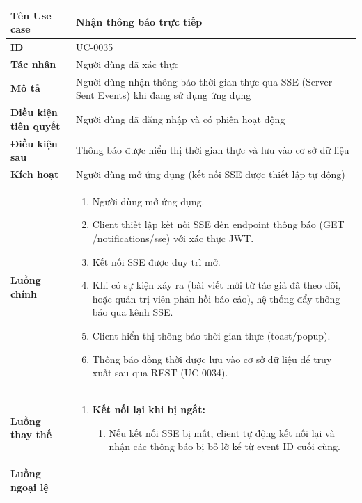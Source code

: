 {
\small
\renewcommand{\arraystretch}{1.15}

\begin{tabularx}{\textwidth}{|>{\raggedright\arraybackslash}p{3.5cm}|>{\raggedright\arraybackslash}X|}
\hline
\textbf{Tên Use case} & Nhận thông báo trực tiếp \\
\hline
\textbf{ID} & UC-0035 \\
\hline
\textbf{Tác nhân} & Người dùng đã xác thực \\
\hline
\textbf{Mô tả} & Người dùng nhận thông báo thời gian thực qua SSE (Server-Sent Events) khi đang sử dụng ứng dụng \\
\hline
\textbf{Điều kiện tiên quyết} & Người dùng đã đăng nhập và có phiên hoạt động \\
\hline
\textbf{Điều kiện sau} & Thông báo được hiển thị thời gian thực và lưu vào cơ sở dữ liệu \\
\hline
\textbf{Kích hoạt} & Người dùng mở ứng dụng (kết nối SSE được thiết lập tự động) \\
\hline
\textbf{Luồng chính} &
\begin{enumerate}
    \item Người dùng mở ứng dụng.
    \item Client thiết lập kết nối SSE đến endpoint thông báo (GET /notifications/sse) với xác thực JWT.
    \item Kết nối SSE được duy trì mở.
    \item Khi có sự kiện xảy ra (bài viết mới từ tác giả đã theo dõi, hoặc quản trị viên phản hồi báo cáo), hệ thống đẩy thông báo qua kênh SSE.
    \item Client hiển thị thông báo thời gian thực (toast/popup).
    \item Thông báo đồng thời được lưu vào cơ sở dữ liệu để truy xuất sau qua REST (UC-0034).
\end{enumerate} \\
\hline
\textbf{Luồng thay thế} &
\begin{enumerate}
    \item \textbf{Kết nối lại khi bị ngắt:}
    \begin{enumerate}
        \item[3A.] Nếu kết nối SSE bị mất, client tự động kết nối lại và nhận các thông báo bị bỏ lỡ kể từ event ID cuối cùng.
    \end{enumerate}
\end{enumerate} \\
\hline
\textbf{Luồng ngoại lệ} &

\end{tabularx}}
